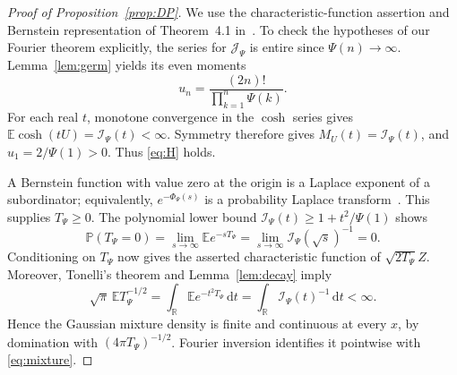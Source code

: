 \documentclass[11pt,twoside]{article}
\theoremstyle{journalplain}
\numberwithin{equation}{section}
\theoremstyle{journaldefinition}
\newcommand{\R}{\mathbb R}
\newcommand{\E}{\mathbb E}
\newcommand{\Prob}{\mathbb P}
\newcommand{\dd}{\,\mathrm d}
\begin{document}
\begin{proof}[Proof of Proposition~\ref{prop:DP}]
We use the characteristic-function assertion and Bernstein representation of Theorem~4.1 in\ \cite{KPS2024}. To check the hypotheses of our Fourier theorem explicitly, the series for $\mathcal J_\Psi$ is entire since $\Psi(n)\to\infty$. Lemma~\ref{lem:germ} yields its even moments
\[
 u_n=\frac{(2n)!}{\prod_{k=1}^n\Psi(k)}.
\]
For each real $t$, monotone convergence in the $\cosh$ series gives $\E\cosh(tU)=\mathcal I_\Psi(t)<\infty$. Symmetry therefore gives $M_U(t)=\mathcal I_\Psi(t)$, and $u_1=2/\Psi(1)>0$. Thus \eqref{eq:H} holds.

A Bernstein function with value zero at the origin is a Laplace exponent of a subordinator; equivalently, $e^{-\Phi_\Psi(s)}$ is a probability Laplace transform\ \cite{SSV2012}. This supplies $T_\Psi\ge0$. The polynomial lower bound $\mathcal I_\Psi(t)\ge1+t^2/\Psi(1)$ shows
\[
 \Prob(T_\Psi=0)=\lim_{s\to\infty}\E e^{-sT_\Psi}
 =\lim_{s\to\infty}\mathcal I_\Psi(\sqrt s)^{-1}=0.
\]
Conditioning on $T_\Psi$ now gives the asserted characteristic function of $\sqrt{2T_\Psi}Z$. Moreover, Tonelli's theorem and Lemma~\ref{lem:decay} imply
\[
 \sqrt\pi\,\E T_\Psi^{-1/2}
 =\int_\R\E e^{-t^2T_\Psi}\dd t
 =\int_\R\mathcal I_\Psi(t)^{-1}\dd t<\infty.
\]
Hence the Gaussian mixture density is finite and continuous at every $x$, by domination with $(4\pi T_\Psi)^{-1/2}$. Fourier inversion identifies it pointwise with \eqref{eq:mixture}.
\end{proof}
\end{document}
